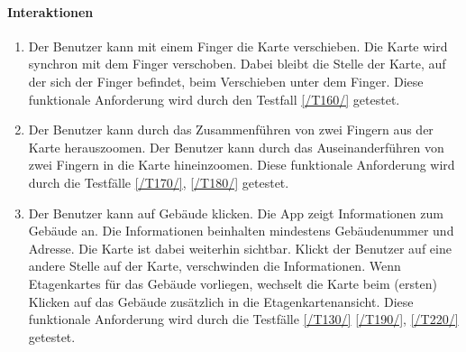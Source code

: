 \paragraph{Interaktionen}
\begin{enumerate}[start=12, label=\textbf{/FA\arabic*/}, align=left]
    \item \label{/FA12/} Der \Gls{Benutzer} kann mit einem Finger die \Gls{Karte} verschieben. Die \Gls{Karte} wird synchron mit dem Finger verschoben. Dabei bleibt die Stelle der \Gls{Karte}, auf der sich der Finger befindet, beim Verschieben unter dem Finger. Diese funktionale Anforderung wird durch den Testfall \ref{/T160/} getestet.
    \item \label{/FA13/} Der \Gls{Benutzer} kann durch das Zusammenführen von zwei Fingern aus der \Gls{Karte} herauszoomen. Der \Gls{Benutzer} kann durch das Auseinanderführen von zwei Fingern in die \Gls{Karte} hineinzoomen. Diese funktionale Anforderung wird durch die Testfälle \ref{/T170/}, \ref{/T180/} getestet.
    \item \label{/FA14/} Der \Gls{Benutzer} kann auf Gebäude klicken. Die App zeigt Informationen zum Gebäude an. Die Informationen beinhalten mindestens Gebäudenummer und Adresse. Die \Gls{Karte} ist dabei weiterhin sichtbar. Klickt der \Gls{Benutzer} auf eine andere Stelle auf der \Gls{Karte}, verschwinden die Informationen. Wenn \Glspl{Etagenkarte} für das Gebäude vorliegen, wechselt die \Gls{Karte} beim (ersten) Klicken auf das Gebäude zusätzlich in die \Gls{Etagenkartenansicht}. Diese funktionale Anforderung wird durch die Testfälle \ref{/T130/} \ref{/T190/}, \ref{/T220/} getestet.
\end{enumerate}
